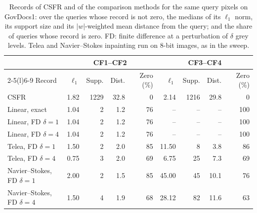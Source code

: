 \documentclass[final,3p]{elsarticle}
\begin{document}
\begin{table}[!t]
\centering
\caption{Records of CSFR and of the comparison methods for the same query pixels on GovDocs1: over the queries whose record is not zero, the medians of its $\ell_1$ norm, its support size and its $|w|$-weighted mean distance from the query; and the share of queries whose record is zero. FD: finite difference at a perturbation of $\delta$ grey levels. Telea and Navier--Stokes inpainting run on 8-bit images, as in the sweep.}
\label{tab:records}
\footnotesize
\begin{tabular}{@{}l*{8}{r}@{}}
\toprule
 & \multicolumn{4}{c}{CF1--CF2} & \multicolumn{4}{c}{CF3--CF4} \\
\cmidrule(lr){2-5}\cmidrule(l){6-9}
Record & $\ell_1$ & Supp. & Dist. & Zero (\%) & $\ell_1$ & Supp. & Dist. & Zero (\%) \\
\midrule
CSFR & 1.82 & 1229 & 32.8 & 0 & 2.14 & 1216 & 29.8 & 0 \\
Linear, exact & 1.04 & 2 & 1.2 & 76 & -- & -- & -- & 100 \\
Linear, FD $\delta = 1$ & 1.04 & 2 & 1.2 & 76 & -- & -- & -- & 100 \\
Linear, FD $\delta = 4$ & 1.04 & 2 & 1.2 & 76 & -- & -- & -- & 100 \\
Telea, FD $\delta = 1$ & 1.50 & 2 & 2.0 & 85 & 11.50 & 8 & 3.8 & 86 \\
Telea, FD $\delta = 4$ & 0.75 & 3 & 2.0 & 69 & 6.75 & 25 & 7.3 & 69 \\
Navier--Stokes, FD $\delta = 1$ & 2.00 & 2 & 1.5 & 85 & 45.00 & 45 & 10.1 & 76 \\
Navier--Stokes, FD $\delta = 4$ & 1.50 & 4 & 1.9 & 68 & 28.12 & 82 & 11.6 & 63 \\
\bottomrule
\end{tabular}
\end{table}
\end{document}
